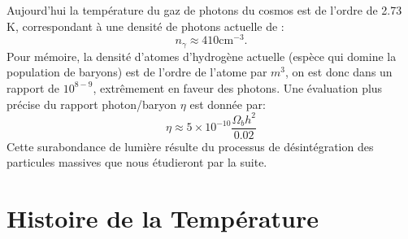Aujourd'hui la température du gaz de photons du cosmos est de l'ordre de 2.73 K, correspondant à une densité de photons actuelle de :
\begin{equation}
n_\gamma\approx 410 \mathrm{cm}^{-3}.
\end{equation}
Pour mémoire, la densité d'atomes d'hydrogène actuelle (espèce qui domine la population de baryons) est de l'ordre de l'atome par $m^3$, on est donc dans un rapport de $10^{8-9}$,  extrêmement en faveur des photons. Une évaluation plus précise du rapport photon/baryon $\eta$ est donnée par:
\begin{equation}
\eta \approx 5\times 10^{-10}\frac{\Omega_b h^2}{0.02}
\end{equation}
Cette surabondance de lumière résulte du processus de désintégration des particules massives que nous étudieront par la suite. 

\section{Histoire de la Température}


